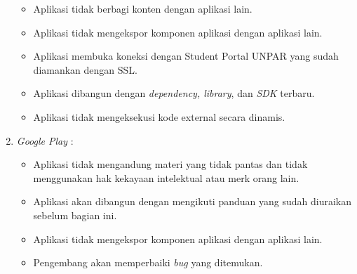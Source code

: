\begin{enumerate}
\begin{itemize}
        \item Aplikasi tidak berbagi  konten dengan aplikasi lain.
        \item Aplikasi tidak mengekspor komponen aplikasi dengan aplikasi lain.
        \item Aplikasi membuka koneksi dengan Student Portal UNPAR yang sudah diamankan dengan SSL.
        \item Aplikasi dibangun dengan \textit{dependency, library}, dan \textit{SDK} terbaru.
        \item Aplikasi tidak mengeksekusi kode external secara dinamis.
    \end{itemize}
    \item \textit{Google Play} : 
    \begin{itemize}
        \item Aplikasi tidak mengandung materi yang tidak pantas dan tidak menggunakan hak kekayaan intelektual atau merk orang lain.
        \item Aplikasi akan dibangun dengan mengikuti panduan yang sudah diuraikan sebelum bagian ini.
        \item Aplikasi tidak mengekspor komponen aplikasi dengan aplikasi lain.
        \item Pengembang akan memperbaiki \textit{bug} yang ditemukan.
    \end{itemize}
\end{enumerate}

